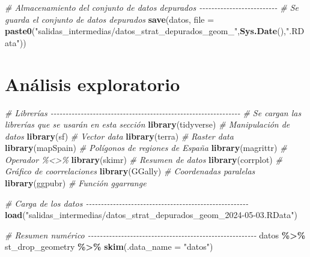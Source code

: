 \documentclass[12pt,a4paper,]{book}
\newenvironment{Shaded}{\begin{snugshade}}{\end{snugshade}}
\newcommand{\AttributeTok}[1]{\textcolor[rgb]{0.13,0.29,0.53}{#1}}
\newcommand{\CommentTok}[1]{\textcolor[rgb]{0.56,0.35,0.01}{\textit{#1}}}
\newcommand{\FunctionTok}[1]{\textcolor[rgb]{0.13,0.29,0.53}{\textbf{#1}}}
\newcommand{\NormalTok}[1]{#1}
\newcommand{\SpecialCharTok}[1]{\textcolor[rgb]{0.81,0.36,0.00}{\textbf{#1}}}
\newcommand{\StringTok}[1]{\textcolor[rgb]{0.31,0.60,0.02}{#1}}
\numberwithin{dummy}{section}
\theoremstyle{ocrenumbox}
\theoremstyle{blacknumex}
\theoremstyle{blacknumbox}
\theoremstyle{ocrenum}
\theoremstyle{ocrenum}
\begin{document}
\begin{Shaded}
\begin{Highlighting}[]
\CommentTok{\# Almacenamiento del conjunto de datos depurados {-}{-}{-}{-}{-}{-}{-}{-}{-}{-}{-}{-}{-}{-}{-}{-}{-}{-}{-}{-}{-}{-}{-}{-}{-}{-}}
\CommentTok{\# Se guarda el conjunto de datos depurados}
\FunctionTok{save}\NormalTok{(datos, }\AttributeTok{file =} \FunctionTok{paste0}\NormalTok{(}\StringTok{"salidas\_intermedias/datos\_strat\_depurados\_geom\_"}\NormalTok{,}\FunctionTok{Sys.Date}\NormalTok{(),}\StringTok{".RData"}\NormalTok{))}
\end{Highlighting}
\end{Shaded}

\hypertarget{anuxe1lisis-exploratorio}{%
\section{Análisis exploratorio}\label{anuxe1lisis-exploratorio}}

\begin{Shaded}
\begin{Highlighting}[]
\CommentTok{\# Librerías {-}{-}{-}{-}{-}{-}{-}{-}{-}{-}{-}{-}{-}{-}{-}{-}{-}{-}{-}{-}{-}{-}{-}{-}{-}{-}{-}{-}{-}{-}{-}{-}{-}{-}{-}{-}{-}{-}{-}{-}{-}{-}{-}{-}{-}{-}{-}{-}{-}{-}{-}{-}{-}{-}{-}{-}{-}{-}{-}{-}{-}{-}{-}}
\CommentTok{\# Se cargan las librerías que se usarán en esta sección}
\FunctionTok{library}\NormalTok{(tidyverse) }\CommentTok{\# Manipulación de datos }
\FunctionTok{library}\NormalTok{(sf) }\CommentTok{\# Vector data}
\FunctionTok{library}\NormalTok{(terra) }\CommentTok{\# Raster data}
\FunctionTok{library}\NormalTok{(mapSpain) }\CommentTok{\# Polígonos de regiones de España}
\FunctionTok{library}\NormalTok{(magrittr) }\CommentTok{\# Operador \%\textless{}\textgreater{}\% }
\FunctionTok{library}\NormalTok{(skimr) }\CommentTok{\# Resumen de datos}
\FunctionTok{library}\NormalTok{(corrplot) }\CommentTok{\# Gráfico de coorrelaciones}
\FunctionTok{library}\NormalTok{(GGally) }\CommentTok{\# Coordenadas paralelas}
\FunctionTok{library}\NormalTok{(ggpubr) }\CommentTok{\# Función ggarrange}

\CommentTok{\# Carga de los datos {-}{-}{-}{-}{-}{-}{-}{-}{-}{-}{-}{-}{-}{-}{-}{-}{-}{-}{-}{-}{-}{-}{-}{-}{-}{-}{-}{-}{-}{-}{-}{-}{-}{-}{-}{-}{-}{-}{-}{-}{-}{-}{-}{-}{-}{-}{-}{-}{-}{-}{-}{-}{-}{-}}
\FunctionTok{load}\NormalTok{(}\StringTok{"salidas\_intermedias/datos\_strat\_depurados\_geom\_2024{-}05{-}03.RData"}\NormalTok{)}

\CommentTok{\# Resumen numérico {-}{-}{-}{-}{-}{-}{-}{-}{-}{-}{-}{-}{-}{-}{-}{-}{-}{-}{-}{-}{-}{-}{-}{-}{-}{-}{-}{-}{-}{-}{-}{-}{-}{-}{-}{-}{-}{-}{-}{-}{-}{-}{-}{-}{-}{-}{-}{-}{-}{-}{-}{-}{-}{-}{-}{-}}
\NormalTok{datos }\SpecialCharTok{\%\textgreater{}\%}\NormalTok{  st\_drop\_geometry }\SpecialCharTok{\%\textgreater{}\%} \FunctionTok{skim}\NormalTok{(}\AttributeTok{.data\_name =} \StringTok{"datos"}\NormalTok{)}
\end{Highlighting}
\end{Shaded}
\end{document}
